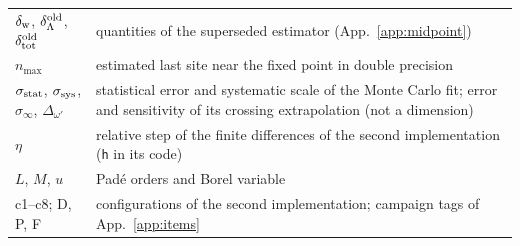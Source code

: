 \documentclass[10pt,a4paper]{article}
\newcommand{\code}[1]{\texttt{#1}}
\newcommand{\dtot}{\delta_{\rm tot}}
\begin{document}
\begin{longtable}{@{}>{\raggedright\arraybackslash}p{3.4cm}p{12.2cm}@{}}
$\delta_{\rm w}$, $\delta^{\rm old}_\Lambda$, $\dtot^{\rm old}$ & quantities of the superseded estimator (App.~\ref{app:midpoint})\\
$n_{\max}$ & estimated last site near the fixed point in double precision\\
$\sigma_{\rm stat}$, $\sigma_{\rm sys}$, $\sigma_\infty$, $\Delta_{\omega'}$ & statistical error and systematic scale of the Monte Carlo fit; error and sensitivity of its crossing extrapolation (not a dimension)\\
$\eta$ & relative step of the finite differences of the second implementation (\code{h} in its code)\\
$L$, $M$, $u$ & Pad\'e orders and Borel variable\\
c1--c8; D, P, F & configurations of the second implementation; campaign tags of App.~\ref{app:items}\\\bottomrule
\end{longtable}
\end{document}
